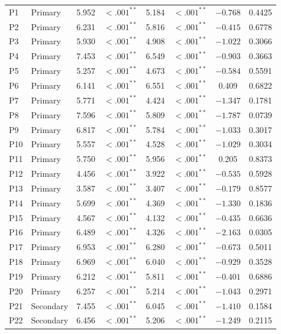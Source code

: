 \begin{longtable}{llcccccc}
P1 & Primary & 5.952 & $<.001^{**}$ & 5.184 & $<.001^{**}$ & $-0.768$ & 0.4425 \\
P2 & Primary & 6.231 & $<.001^{**}$ & 5.816 & $<.001^{**}$ & $-0.415$ & 0.6778 \\
P3 & Primary & 5.930 & $<.001^{**}$ & 4.908 & $<.001^{**}$ & $-1.022$ & 0.3066 \\
P4 & Primary & 7.453 & $<.001^{**}$ & 6.549 & $<.001^{**}$ & $-0.903$ & 0.3663 \\
P5 & Primary & 5.257 & $<.001^{**}$ & 4.673 & $<.001^{**}$ & $-0.584$ & 0.5591 \\
P6 & Primary & 6.141 & $<.001^{**}$ & 6.551 & $<.001^{**}$ & 0.409 & 0.6822 \\
P7 & Primary & 5.771 & $<.001^{**}$ & 4.424 & $<.001^{**}$ & $-1.347$ & 0.1781 \\
P8 & Primary & 7.596 & $<.001^{**}$ & 5.809 & $<.001^{**}$ & $-1.787$ & 0.0739 \\
P9 & Primary & 6.817 & $<.001^{**}$ & 5.784 & $<.001^{**}$ & $-1.033$ & 0.3017 \\
P10 & Primary & 5.557 & $<.001^{**}$ & 4.528 & $<.001^{**}$ & $-1.029$ & 0.3034 \\
P11 & Primary & 5.750 & $<.001^{**}$ & 5.956 & $<.001^{**}$ & 0.205 & 0.8373 \\
P12 & Primary & 4.456 & $<.001^{**}$ & 3.922 & $<.001^{**}$ & $-0.535$ & 0.5928 \\
P13 & Primary & 3.587 & $<.001^{**}$ & 3.407 & $<.001^{**}$ & $-0.179$ & 0.8577 \\
P14 & Primary & 5.699 & $<.001^{**}$ & 4.369 & $<.001^{**}$ & $-1.330$ & 0.1836 \\
P15 & Primary & 4.567 & $<.001^{**}$ & 4.132 & $<.001^{**}$ & $-0.435$ & 0.6636 \\
P16 & Primary & 6.489 & $<.001^{**}$ & 4.326 & $<.001^{**}$ & $-2.163$ & 0.0305 \\
P17 & Primary & 6.953 & $<.001^{**}$ & 6.280 & $<.001^{**}$ & $-0.673$ & 0.5011 \\
P18 & Primary & 6.969 & $<.001^{**}$ & 6.040 & $<.001^{**}$ & $-0.929$ & 0.3528 \\
P19 & Primary & 6.212 & $<.001^{**}$ & 5.811 & $<.001^{**}$ & $-0.401$ & 0.6886 \\
P20 & Primary & 6.257 & $<.001^{**}$ & 5.214 & $<.001^{**}$ & $-1.043$ & 0.2971 \\
\midrule
P21 & Secondary & 7.455 & $<.001^{**}$ & 6.045 & $<.001^{**}$ & $-1.410$ & 0.1584 \\
P22 & Secondary & 6.456 & $<.001^{**}$ & 5.206 & $<.001^{**}$ & $-1.249$ & 0.2115 \\

\end{longtable}
